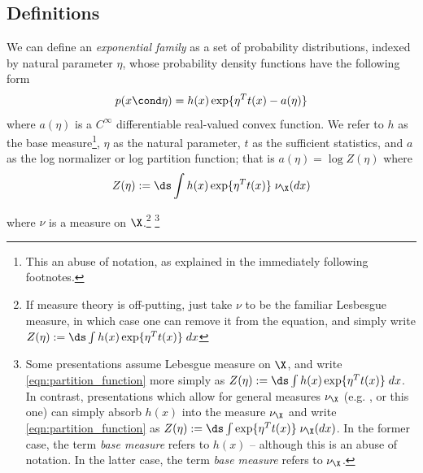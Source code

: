 \documentclass{article} %
\begin{document}
\subsection{Definitions}
\begin{definition}
We can define an \textit{exponential family} as a set of probability distributions, indexed by natural parameter $\eta$,  whose probability density functions have the following form
\begin{align}
\label{eqn:exponential_family_natural}
 p(x \cond \eta) = h(x) \exp \{ \eta^T t(x) - a(\eta)\} 
 \end{align}
where $a(\eta)$ is a $C^{\infty}$ differentiable real-valued convex function. We refer to $h$ as the base measure\footnote{This an abuse of notation, as explained in the immediately following footnotes.}, $\eta$ as the natural parameter, $t$ as the sufficient statistics, and $a$ as the log normalizer or log partition function;  that is $a(\eta) = \log Z(\eta)$ where 
\begin{equation}
\label{eqn:partition_function}
 Z(\eta) := \ds\int  h(x) \exp \{ \eta^T t(x)  \} \; \nu_\X(dx)	
\end{equation}

where $\nu$ is a measure on $\X$.\footnote{If measure theory is off-putting, just take $\nu$ to be the familiar Lesbesgue measure, in which case one can remove it from the equation, and simply write $Z(\eta) := \ds\int  h(x) \exp \{ \eta^T t(x)  \} \; dx $ }  \footnote{Some presentations assume Lebesgue measure on $\X$, and write \eqref{eqn:partition_function} more simply as $Z(\eta) := \ds\int  h(x) \exp \{ \eta^T t(x)  \} \; dx $.  In contrast, presentations which allow for general measures $\nu_\X$ (e.g. \cite{johnson2016composing}, or this one)  can simply absorb $h(x)$ into the measure $\nu_\X$ and write \eqref{eqn:partition_function} as $Z(\eta) := \ds\int  \exp \{ \eta^T t(x)  \} \; \nu_\X (dx) $.  In the former case, the term \textit{base measure} refers to $h(x)$ -- although this is an abuse of notation.  In the latter case, the term \textit{base measure} refers to $\nu_\X$.}   
\label{def:exponential_family}
\end{definition} 
\end{document}
